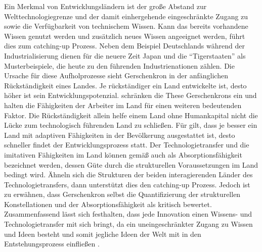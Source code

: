 Ein Merkmal von Entwicklungsländern ist der große Abstand zur Welttechnologiegrenze und der damit einhergehende eingeschränkte Zugang zu sowie die Verfügbarkeit von technischem Wissen. Kann das bereits vorhandene Wissen genutzt werden und zusätzlich neues Wissen angeeignet werden, führt dies zum catching-up Prozess. Neben dem Beispiel Deutschlands während der Industrialisierung dienen für die neuere Zeit Japan und die "`Tigerstaaten"' als Musterbeispiele, die heute zu den führenden Industrienationen zählen. Die Ursache für diese Aufholprozesse sieht Gerschenkron in der anfänglichen Rückständigkeit eines Landes. Je rückständiger ein Land entwickelte ist, desto höher ist sein Entwicklungspotenzial. \cite{Nelson.1966}  schränken die These Gerschenkrons ein und halten die Fähigkeiten der Arbeiter im Land für einen weiteren bedeutenden Faktor. Die Rückständigkeit allein helfe einem Land ohne Humankapital nicht die Lücke zum technologisch führenden Land zu schließen. Für \cite{Nelson.1966} gilt, dass je besser ein Land mit adaptiven Fähigkeiten in der Bevölkerung ausgestattet ist, desto schneller findet der Entwicklungsprozess statt. Der Technologietransfer und die imitativen Fähigkeiten im Land können gemäß \cite{Abramovitz.1986} auch als Absorptionsfähigkeit bezeichnet werden, dessen Güte durch die strukturellen Voraussetzungen im Land bedingt wird. Ähneln sich die Strukturen der beiden interagierenden Länder des Technologietransfers, dann unterstützt dies den catching-up Prozess. Jedoch ist zu erwähnen, dass Gerschenkron selbst die Quantifizierung der strukturellen Konstellationen und der Absorptionsfähigkeit als kritisch bewertet. \\
%
Zusammenfassend lässt sich festhalten, dass jede Innovation einen Wissens- und Technologietransfer mit sich bringt, da ein uneingeschränkter Zugang zu Wissen und Ideen besteht und somit jegliche Ideen der Welt mit in den Entstehungsprozess einfließen \cite{Gerschenkron.1962}.
%
